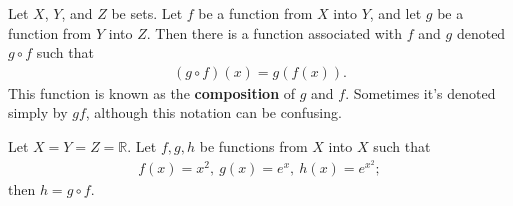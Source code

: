 \documentclass[12pt]{article}
\begin{document}
\begin{defn}
  Let $X$, $Y$, and $Z$ be sets. Let $f$ be a function from $X$ into $Y$, and let $g$
  be a function from $Y$ into $Z$. Then there is a function associated with $f$ and
  $g$ denoted $g \circ f$ such that
  \begin{align*}
    (g \circ f)(x) = g(f(x)).
  \end{align*}
  This function is known as the \textbf{composition} of $g$ and $f$. Sometimes it's
  denoted simply by $gf$, although this notation can be confusing.
\end{defn}

\begin{exm}
  Let $X = Y = Z = \mathbb{R}$. Let $f,g,h$ be functions from $X$ into $X$ such that
  \begin{align*}
    f(x) = x^2,\ g(x) = e^x,\ h(x) = e^{x^2};
  \end{align*}
  then $h = g \circ f$.
\end{exm}
\end{document}
